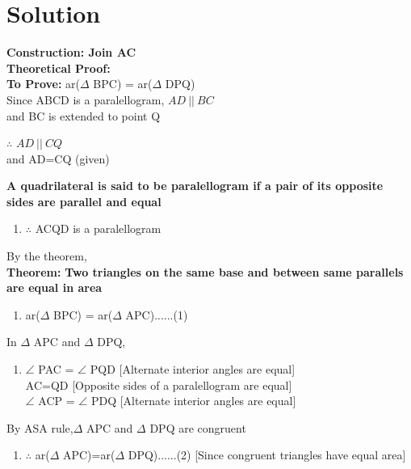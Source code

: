 \documentclass[journal,12pt,twocolumn]{IEEEtran}
\begin{document}
\section{Solution}
\justify
\textbf{Construction: Join AC}\\
\textbf{Theoretical Proof:}\\
\textbf{To Prove:}
ar($\Delta$ BPC) = ar($\Delta$ DPQ)\\
Since ABCD is a paralellogram, $ AD \: || \: BC $\\
and BC is extended to point Q\\
\begin{enumerate}
$\therefore$ $ AD \: || \: CQ $\\ and AD=CQ  (given)\\
\end{enumerate}
\textbf{A quadrilateral is said to be paralellogram if a pair of its opposite sides are parallel and equal}\\
\begin{enumerate}
\item[]
$\therefore$ ACQD is a paralellogram\\
\end{enumerate}
By the theorem,\\
\textbf{Theorem:}
\textbf{Two triangles on the same base and between same parallels are equal in area}\\
\begin{enumerate}
\item[]
ar($\Delta$ BPC) = ar($\Delta$ APC)......(1)\\
\end{enumerate}
In $\Delta$ APC and $\Delta$ DPQ,\\
\begin{enumerate}
\item[]
$\angle$ PAC = $\angle$ PQD [Alternate interior angles are equal]\\ 
AC=QD [Opposite sides of a paralellogram are equal]\\
$\angle$ ACP = $\angle$ PDQ [Alternate interior angles are equal]\\
\end{enumerate}
By ASA rule,$\Delta$ APC and $\Delta$ DPQ are congruent\\
\begin{enumerate}
\item[] $\therefore$ ar($\Delta$ APC)=ar($\Delta$ DPQ)......(2) [Since congruent triangles have equal area]\\
\end{enumerate}
\end{document}
